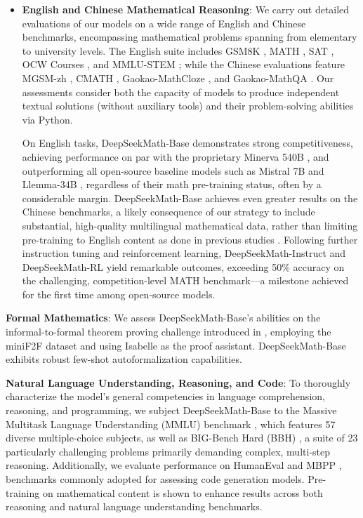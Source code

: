 \begin{itemize}[topsep=0pt]
    \item \textbf{English and Chinese Mathematical Reasoning}: We carry out detailed evaluations of our models on a wide range of English and Chinese benchmarks, encompassing mathematical problems spanning from elementary to university levels. The English suite includes GSM8K \citep{gsm8k}, MATH \citep{MATH}, SAT \citep{llemma}, OCW Courses \citep{minerva}, and MMLU-STEM \citep{mmlu}; while the Chinese evaluations feature MGSM-zh \citep{mgsm}, CMATH \citep{wei2023cmath}, Gaokao-MathCloze \citep{agieval}, and Gaokao-MathQA \citep{agieval}. Our assessments consider both the capacity of models to produce independent textual solutions (without auxiliary tools) and their problem-solving abilities via Python.

    On English tasks, DeepSeekMath-Base demonstrates strong competitiveness, achieving performance on par with the proprietary Minerva 540B \citep{minerva}, and outperforming all open-source baseline models such as Mistral 7B \citep{mistral} and Llemma-34B \citep{llemma}, regardless of their math pre-training status, often by a considerable margin. DeepSeekMath-Base achieves even greater results on the Chinese benchmarks, a likely consequence of our strategy to include substantial, high-quality multilingual mathematical data, rather than limiting pre-training to English content as done in previous studies \citep{minerva,llemma}. Following further instruction tuning and reinforcement learning, DeepSeekMath-Instruct and DeepSeekMath-RL yield remarkable outcomes, exceeding 50\% accuracy on the challenging, competition-level MATH benchmark—a milestone achieved for the first time among open-source models.
\end{itemize}

\item \textbf{Formal Mathematics}: We assess DeepSeekMath-Base's abilities on the informal-to-formal theorem proving challenge introduced in \citep{dsp_proof}, employing the miniF2F dataset \citep{minif2f} and using Isabelle \citep{isabelle} as the proof assistant. DeepSeekMath-Base exhibits robust few-shot autoformalization capabilities.
\item \textbf{Natural Language Understanding, Reasoning, and Code}: To thoroughly characterize the model's general competencies in language comprehension, reasoning, and programming, we subject DeepSeekMath-Base to the Massive Multitask Language Understanding (MMLU) benchmark \citep{mmlu}, which features 57 diverse multiple-choice subjects, as well as BIG-Bench Hard (BBH) \citep{bbh}, a suite of 23 particularly challenging problems primarily demanding complex, multi-step reasoning. Additionally, we evaluate performance on HumanEval \citep{codex} and MBPP \citep{mbpp}, benchmarks commonly adopted for assessing code generation models. Pre-training on mathematical content is shown to enhance results across both reasoning and natural language understanding benchmarks.

